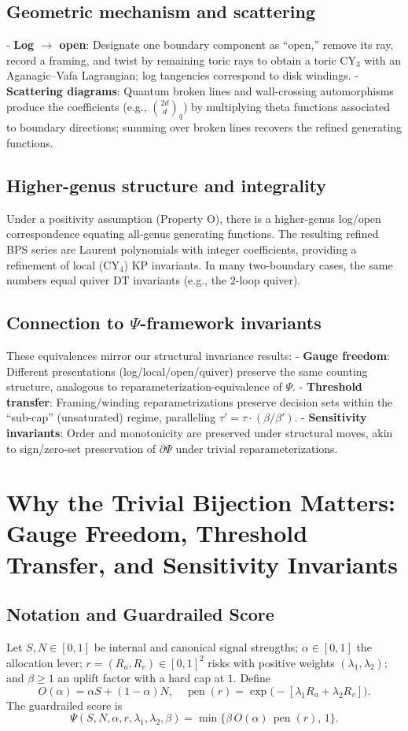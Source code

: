 \documentclass[12pt,a4paper]{article}
\begin{document}
\subsection{Geometric mechanism and scattering}
- \textbf{Log $\to$ open}: Designate one boundary component as “open,” remove its ray, record a framing, and twist by remaining toric rays to obtain a toric CY$_3$ with an Aganagic–Vafa Lagrangian; log tangencies correspond to disk windings.
- \textbf{Scattering diagrams}: Quantum broken lines and wall-crossing automorphisms produce the coefficients (e.g., $\binom{2d}{d}_q$) by multiplying theta functions associated to boundary directions; summing over broken lines recovers the refined generating functions.

\subsection{Higher-genus structure and integrality}
Under a positivity assumption (Property O), there is a higher-genus log/open correspondence equating all-genus generating functions. The resulting refined BPS series are Laurent polynomials with integer coefficients, providing a refinement of local (CY$_4$) KP invariants. In many two-boundary cases, the same numbers equal quiver DT invariants (e.g., the $2$-loop quiver).

\subsection{Connection to $\Psi$-framework invariants}
These equivalences mirror our structural invariance results:
- \textbf{Gauge freedom}: Different presentations (log/local/open/quiver) preserve the same counting structure, analogous to reparameterization-equivalence of $\Psi$.
- \textbf{Threshold transfer}: Framing/winding reparametrizations preserve decision sets within the “sub-cap” (unsaturated) regime, paralleling $\tau'=\tau\cdot(\beta/\beta')$.
- \textbf{Sensitivity invariants}: Order and monotonicity are preserved under structural moves, akin to sign/zero-set preservation of $\partial\Psi$ under trivial reparameterizations.

\section{Why the Trivial Bijection Matters: Gauge Freedom, Threshold Transfer, and Sensitivity Invariants}

\subsection{Notation and Guardrailed Score}
Let $S,N\in[0,1]$ be internal and canonical signal strengths; $\alpha\in[0,1]$ the allocation lever; $r=(R_a,R_v)\in[0,1]^2$ risks with positive weights $(\lambda_1,\lambda_2)$; and $\beta\ge 1$ an uplift factor with a hard cap at $1$. Define
\[
O(\alpha) = \alpha S + (1-\alpha)N, \quad \operatorname{pen}(r) = \exp\!\big(-[\lambda_1 R_a + \lambda_2 R_v]\big).
\]
The guardrailed score is
\[
\Psi(S,N,\alpha,r,\lambda_1,\lambda_2,\beta) = \min\{\beta\,O(\alpha)\,\operatorname{pen}(r),\,1\}.
\]
\end{document}
